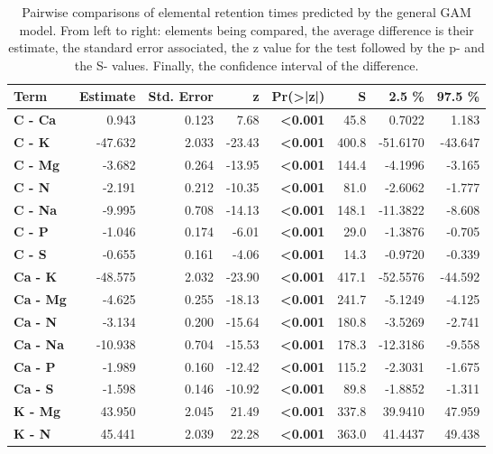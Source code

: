 \begin{table}[H]
\centering
\caption{\label{tab:table_pairs_i_rt}Pairwise comparisons of elemental retention times predicted by the general GAM model. From left to right: elements being compared, the average difference is their estimate, the standard error associated, the z value for the test followed by the p- and the S- values. Finally, the confidence interval of the difference.}
\centering
\begin{tabular}[t]{>{}lrrr>{}rrrr}
\toprule
\textbf{Term} & \textbf{Estimate} & \textbf{Std. Error} & \textbf{z} & \textbf{Pr(>|z|)} & \textbf{S} & \textbf{2.5 \%} & \textbf{97.5 \%}\\
\midrule
\textbf{C - Ca} & 0.943 & 0.123 & 7.68 & \textbf{<0.001} & 45.8 & 0.7022 & 1.183\\
\textbf{C - K} & -47.632 & 2.033 & -23.43 & \textbf{<0.001} & 400.8 & -51.6170 & -43.647\\
\textbf{C - Mg} & -3.682 & 0.264 & -13.95 & \textbf{<0.001} & 144.4 & -4.1996 & -3.165\\
\textbf{C - N} & -2.191 & 0.212 & -10.35 & \textbf{<0.001} & 81.0 & -2.6062 & -1.777\\
\textbf{C - Na} & -9.995 & 0.708 & -14.13 & \textbf{<0.001} & 148.1 & -11.3822 & -8.608\\
\textbf{C - P} & -1.046 & 0.174 & -6.01 & \textbf{<0.001} & 29.0 & -1.3876 & -0.705\\
\textbf{C - S} & -0.655 & 0.161 & -4.06 & \textbf{<0.001} & 14.3 & -0.9720 & -0.339\\
\textbf{Ca - K} & -48.575 & 2.032 & -23.90 & \textbf{<0.001} & 417.1 & -52.5576 & -44.592\\
\textbf{Ca - Mg} & -4.625 & 0.255 & -18.13 & \textbf{<0.001} & 241.7 & -5.1249 & -4.125\\
\textbf{Ca - N} & -3.134 & 0.200 & -15.64 & \textbf{<0.001} & 180.8 & -3.5269 & -2.741\\
\textbf{Ca - Na} & -10.938 & 0.704 & -15.53 & \textbf{<0.001} & 178.3 & -12.3186 & -9.558\\
\textbf{Ca - P} & -1.989 & 0.160 & -12.42 & \textbf{<0.001} & 115.2 & -2.3031 & -1.675\\
\textbf{Ca - S} & -1.598 & 0.146 & -10.92 & \textbf{<0.001} & 89.8 & -1.8852 & -1.311\\
\textbf{K - Mg} & 43.950 & 2.045 & 21.49 & \textbf{<0.001} & 337.8 & 39.9410 & 47.959\\
\textbf{K - N} & 45.441 & 2.039 & 22.28 & \textbf{<0.001} & 363.0 & 41.4437 & 49.438\\

\end{tabular}
\end{table}

